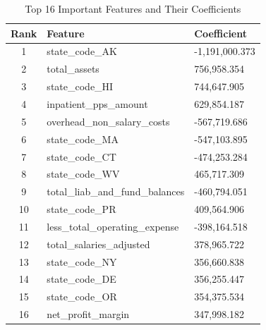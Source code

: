 \documentclass{article}
\theoremstyle{mytheoremstyle}
\theoremstyle{mytheoremstyle}
\theoremstyle{myproblemstyle}
\begin{document}
\begin{table}[ht]
\centering
\caption{Top 16 Important Features and Their Coefficients}
\begin{tabular}{@{}cll@{}}
\toprule
Rank & Feature & Coefficient \\
\midrule
1 & state\_code\_AK & -1,191,000.373 \\
2 & total\_assets & 756,958.354 \\
3 & state\_code\_HI & 744,647.905 \\
4 & inpatient\_pps\_amount & 629,854.187 \\
5 & overhead\_non\_salary\_costs & -567,719.686 \\
6 & state\_code\_MA & -547,103.895 \\
7 & state\_code\_CT & -474,253.284 \\
8 & state\_code\_WV & 465,717.309 \\
9 & total\_liab\_and\_fund\_balances & -460,794.051 \\
10 & state\_code\_PR & 409,564.906 \\
11 & less\_total\_operating\_expense & -398,164.518 \\
12 & total\_salaries\_adjusted & 378,965.722 \\
13 & state\_code\_NY & 356,660.838 \\
14 & state\_code\_DE & 356,255.447 \\
15 & state\_code\_OR & 354,375.534 \\
16 & net\_profit\_margin & 347,998.182 \\
\bottomrule
\end{tabular}
\label{tab:important_features}
\end{table}
\end{document}
